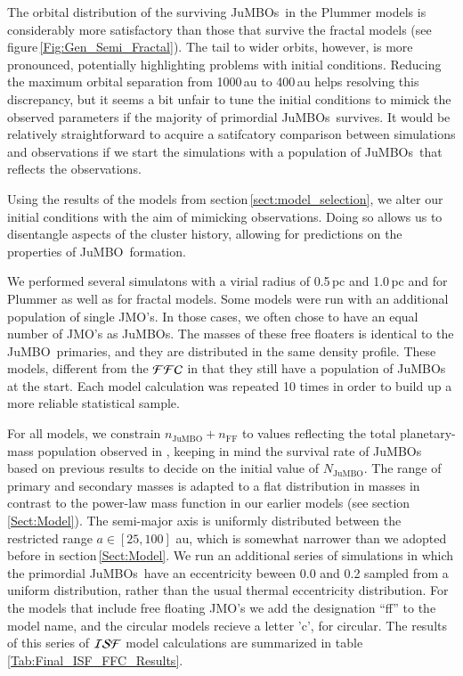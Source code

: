 \documentclass[submission,phys]{lib/SciPost}
\newcommand{\jumbo}{\mbox{JuMBO}}
\newcommand{\jumbos}{\mbox{JuMBOs}}
\begin{document}
The orbital distribution of the surviving \jumbos\, in the Plummer
models is considerably more satisfactory than those that survive the
fractal models (see figure\,\ref{Fig:Gen_Semi_Fractal}). The tail to
wider orbits, however, is more pronounced, potentially highlighting
problems with initial conditions.
Reducing the maximum orbital separation from 1000\,au to 400\,au helps
resolving this discrepancy, but it seems a bit unfair to tune the
initial conditions to mimick the observed parameters if the majority
of primordial \jumbos\ survives. It would be relatively
straightforward to acquire a satifcatory comparison between
simulations and observations if we start the simulations with a
population of \jumbos\, that reflects the observations.

Using the results of the models from
section\,\ref{sect:model_selection}, we alter our initial conditions
with the aim of mimicking observations. Doing so allows us to
disentangle aspects of the cluster history, allowing for predictions
on the properties of \jumbo\, formation.

We performed several simulatons with a virial radius of 0.5\,pc and
1.0\,pc and for Plummer as well as for fractal models. Some models
were run with an additional population of single JMO's. In those
cases, we often chose to have an equal number of JMO's as \jumbos.
The masses of these free floaters is identical to the \jumbo\,
primaries, and they are distributed in the same density profile.
These models, different from the ${\cal FFC}$ in that they still have
a population of \jumbos\, at the start. Each model calculation was
repeated 10 times in order to build up a more reliable statistical
sample.

For all models, we constrain $n_{\mathrm{\jumbo}} + n_{\mathrm{FF}}$
to values reflecting the total planetary-mass population observed in
\cite{2023arXiv231001231P}, keeping in mind the survival rate of
\jumbos\, based on previous results to decide on the initial value of
$N_{\mathrm{\jumbo}}$. The range of primary and secondary masses is
adapted to a flat distribution in masses in contrast to the power-law
mass function in our earlier models (see
section\,\ref{Sect:Model}). The semi-major axis is uniformly
distributed between the restricted range $a\in[25,100]$ au, which is
somewhat narrower than we adopted before in section\,\ref{Sect:Model}.
We run an additional series of simulations in which the primordial
\jumbos\, have an eccentricity beween 0.0 and 0.2 sampled from a
uniform distribution, rather than the usual thermal eccentricity
distribution.  For the models that include free floating JMO's we add
the designation ``ff'' to the model name, and the circular models
recieve a letter 'c', for circular.  The results of this series of
${\cal ISF}$ model calculations are summarized in table
\ref{Tab:Final_ISF_FFC_Results}.
      
\end{document}
